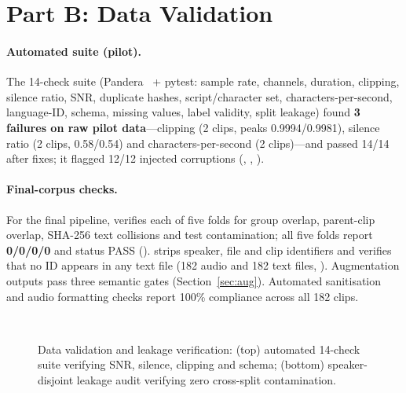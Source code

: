 \documentclass[sigconf,authordraft]{acmart}
\begin{document}
\section{Part B: Data Validation}\label{sec:valid}
\paragraph{Automated suite (pilot).}
The 14-check suite (Pandera~\cite{Bantilan2020} + pytest: sample rate, channels, duration, clipping, silence ratio, SNR, duplicate hashes, script/character set, characters-per-second, language-ID, schema, missing values, label validity, split leakage) found \textbf{3 failures on raw pilot data}---clipping (2 clips, peaks 0.9994/0.9981), silence ratio (2 clips, 0.58/0.54) and characters-per-second (2 clips)---and passed 14/14 after fixes; it flagged 12/12 injected corruptions (, , ).
\paragraph{Final-corpus checks.}
For the final pipeline,  verifies each of five folds for group overlap, parent-clip overlap, SHA-256 text collisions and test contamination; all five folds report \textbf{0/0/0/0} and status PASS ().  strips speaker, file and clip identifiers and verifies that no ID appears in any text file (182 audio and 182 text files, ). Augmentation outputs pass three semantic gates (Section~\ref{sec:aug}). Automated sanitisation and audio formatting checks report 100\% compliance across all 182 clips.
\begin{figure}[!htbp]
\centering
{}\\[4pt]
\caption{Data validation and leakage verification: (top) automated 14-check suite verifying SNR, silence, clipping and schema; (bottom) speaker-disjoint leakage audit verifying zero cross-split contamination.}
\label{fig:valid_shots}
\end{figure}
\FloatBarrier
\end{document}
